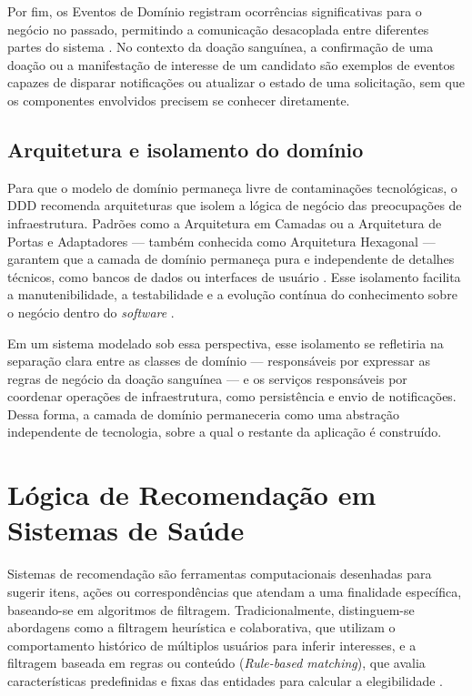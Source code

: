 Por fim, os Eventos de Domínio registram ocorrências significativas para o negócio no passado, permitindo a comunicação desacoplada entre diferentes partes do sistema \cite{vernon2016}. No contexto da doação sanguínea, a confirmação de uma doação ou a manifestação de interesse de um candidato são exemplos de eventos capazes de disparar notificações ou atualizar o estado de uma solicitação, sem que os componentes envolvidos precisem se conhecer diretamente.

\subsection{Arquitetura e isolamento do domínio}

Para que o modelo de domínio permaneça livre de contaminações tecnológicas, o DDD recomenda arquiteturas que isolem a lógica de negócio das preocupações de infraestrutura. Padrões como a Arquitetura em Camadas ou a Arquitetura de Portas e Adaptadores --- também conhecida como Arquitetura Hexagonal --- garantem que a camada de domínio permaneça pura e independente de detalhes técnicos, como bancos de dados ou interfaces de usuário \cite{evans2003}. Esse isolamento facilita a manutenibilidade, a testabilidade e a evolução contínua do conhecimento sobre o negócio dentro do \textit{software} \cite{vernon2016}.

Em um sistema modelado sob essa perspectiva, esse isolamento se refletiria na separação clara entre as classes de domínio --- responsáveis por expressar as regras de negócio da doação sanguínea --- e os serviços responsáveis por coordenar operações de infraestrutura, como persistência e envio de notificações. Dessa forma, a camada de domínio permaneceria como uma abstração independente de tecnologia, sobre a qual o restante da aplicação é construído.

\section{Lógica de Recomendação em Sistemas de Saúde}
\label{sec:recomendacao}

Sistemas de recomendação são ferramentas computacionais desenhadas para sugerir itens, ações ou correspondências que atendam a uma finalidade específica, baseando-se em algoritmos de filtragem. Tradicionalmente, distinguem-se abordagens como a filtragem heurística e colaborativa, que utilizam o comportamento histórico de múltiplos usuários para inferir interesses, e a filtragem baseada em regras ou conteúdo (\textit{Rule-based matching}), que avalia características predefinidas e fixas das entidades para calcular a elegibilidade \cite{ricci2015}.

